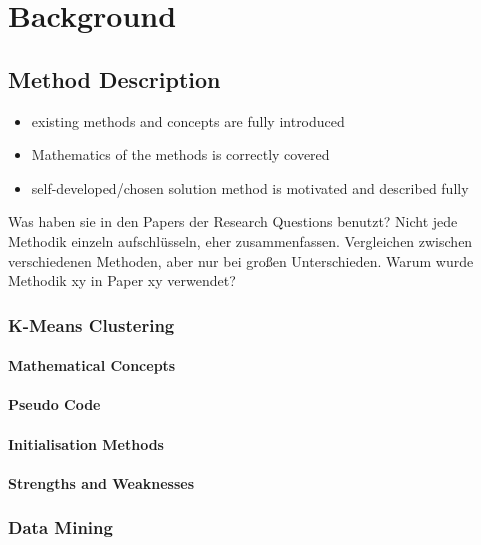 \chapter{Background}
\label{cha:background}

\section{Method Description}
\label{sec:method_description}
\begin{itemize}
    \item existing methods and concepts are fully introduced
    \item Mathematics of the methods is correctly covered
    \item self-developed/chosen solution method is motivated and described fully
\end{itemize}

Was haben sie in den Papers der Research Questions benutzt?
Nicht jede Methodik einzeln aufschlüsseln, eher zusammenfassen.
Vergleichen zwischen verschiedenen Methoden, aber nur bei großen Unterschieden.
Warum wurde Methodik xy in Paper xy verwendet?

\subsection{K-Means Clustering}
\subsubsection*{Mathematical Concepts}
\subsubsection*{Pseudo Code}
\subsubsection*{Initialisation Methods}
\subsubsection*{Strengths and Weaknesses}

\subsection{Data Mining}